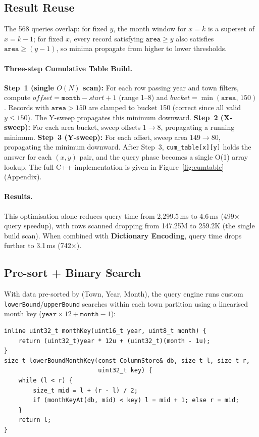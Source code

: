 \documentclass[11pt,a4paper]{article}
\begin{document}
\subsection{Result Reuse}\label{sec:reuse}

The 568 queries overlap: for fixed $y$, the month window for $x{=}k$ is a superset of $x{=}k{-}1$; for fixed $x$, every record satisfying $\texttt{area} \ge y$ also satisfies $\texttt{area} \ge (y{-}1)$, so minima propagate from higher to lower thresholds.

\paragraph{Three-step Cumulative Table Build.}
\textbf{Step~1 (single $O(N)$ scan):} For each row passing year and town filters, compute $\textit{offset} = \texttt{month} - \textit{start} + 1$ (range 1--8) and $\textit{bucket} = \min(\texttt{area},\, 150)$.
Records with $\texttt{area} > 150$ are clamped to bucket 150 (correct since all valid $y \le 150$). The Y-sweep propagates this minimum downward.
\textbf{Step~2 (X-sweep):} For each area bucket, sweep offsets $1 \to 8$, propagating a running minimum.
\textbf{Step~3 (Y-sweep):} For each offset, sweep area $149 \to 80$, propagating the minimum downward.
After Step~3, \texttt{cum\_table[x][y]} holds the answer for each $(x,y)$ pair, and the query phase becomes a single O(1) array lookup.
The full C++ implementation is given in Figure~\ref{fig:cumtable} (Appendix).

\paragraph{Results.}
This optimisation alone reduces query time from 2,299.5\,ms to 4.6\,ms (499$\times$ query speedup), with rows scanned dropping from 147.25M to 259.2K (the single build scan).
When combined with \textbf{Dictionary Encoding}, query time drops further to 3.1\,ms (742$\times$).

\subsection{Pre-sort + Binary Search}\label{sec:binsearch}

With data pre-sorted by (Town, Year, Month), the query engine runs custom \texttt{lowerBound}/\texttt{upperBound} searches within each town partition using a linearised month key ($\texttt{year} \times 12 + \texttt{month} - 1$):

\begin{lstlisting}[caption={Binary search on linearised month key.}]
inline uint32_t monthKey(uint16_t year, uint8_t month) {
    return (uint32_t)year * 12u + (uint32_t)(month - 1u);
}
size_t lowerBoundMonthKey(const ColumnStore& db, size_t l, size_t r,
                          uint32_t key) {
    while (l < r) {
        size_t mid = l + (r - l) / 2;
        if (monthKeyAt(db, mid) < key) l = mid + 1; else r = mid;
    }
    return l;
}
\end{lstlisting}
\end{document}
